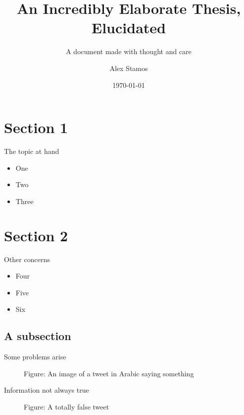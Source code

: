 \documentclass[nobackground,dvipsnames,table]{beamer}
\title[Elaborate Thesis]{An Incredibly Elaborate Thesis, Elucidated}
\subtitle{A document made with thought and care}
\author[A. Stamos]{Alex Stamos}
\institute[Stanford University]{Stanford Cyber Policy Center}
\date[2022]{\today}
\begin{document}
\begin{frame}
    \titlepage
\end{frame}

\section{Section 1}

\begin{frame}{The topic at hand}
    \begin{itemize}
        \item One
        \item Two
        \item Three
    \end{itemize}
\end{frame}

\section{Section 2}

\begin{frame}{Other concerns}
    \begin{itemize}
        \item Four
        \item Five
        \item Six
    \end{itemize}
\end{frame}

\subsection{A subsection}

\begin{frame}{Some problems arise}
    \begin{figure}[ht]
        \center
        {Figure: An image of a tweet in Arabic saying something}
    \end{figure}
\end{frame}

\begin{frame}{Information not always true }
    \begin{figure}[ht]
        \center
        {Figure: A totally false tweet}
    \end{figure}
\end{frame}
\end{document}
